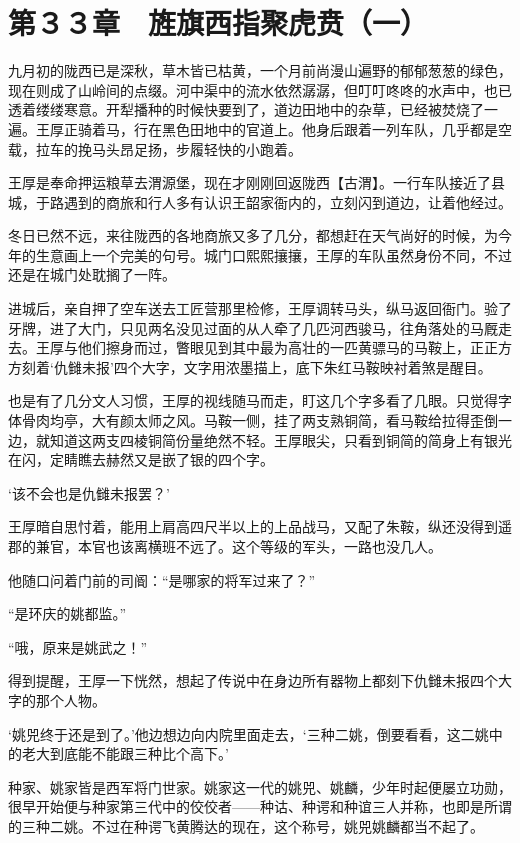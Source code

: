 \section{第３３章　旌旗西指聚虎贲（一）}

九月初的陇西已是深秋，草木皆已枯黄，一个月前尚漫山遍野的郁郁葱葱的绿色，现在则成了山岭间的点缀。河中渠中的流水依然潺潺，但叮叮咚咚的水声中，也已透着缕缕寒意。开犁播种的时候快要到了，道边田地中的杂草，已经被焚烧了一遍。王厚正骑着马，行在黑色田地中的官道上。他身后跟着一列车队，几乎都是空载，拉车的挽马头昂足扬，步履轻快的小跑着。

王厚是奉命押运粮草去渭源堡，现在才刚刚回返陇西【古渭】。一行车队接近了县城，于路遇到的商旅和行人多有认识王韶家衙内的，立刻闪到道边，让着他经过。

冬日已然不远，来往陇西的各地商旅又多了几分，都想赶在天气尚好的时候，为今年的生意画上一个完美的句号。城门口熙熙攘攘，王厚的车队虽然身份不同，不过还是在城门处耽搁了一阵。

进城后，亲自押了空车送去工匠营那里检修，王厚调转马头，纵马返回衙门。验了牙牌，进了大门，只见两名没见过面的从人牵了几匹河西骏马，往角落处的马厩走去。王厚与他们擦身而过，瞥眼见到其中最为高壮的一匹黄骠马的马鞍上，正正方方刻着‘仇雠未报’四个大字，文字用浓墨描上，底下朱红马鞍映衬着煞是醒目。

也是有了几分文人习惯，王厚的视线随马而走，盯这几个字多看了几眼。只觉得字体骨肉均亭，大有颜太师之风。马鞍一侧，挂了两支熟铜简，看马鞍给拉得歪倒一边，就知道这两支四棱铜简份量绝然不轻。王厚眼尖，只看到铜简的简身上有银光在闪，定睛瞧去赫然又是嵌了银的四个字。

‘该不会也是仇雠未报罢？’

王厚暗自思忖着，能用上肩高四尺半以上的上品战马，又配了朱鞍，纵还没得到遥郡的兼官，本官也该离横班不远了。这个等级的军头，一路也没几人。

他随口问着门前的司阍：“是哪家的将军过来了？”

“是环庆的姚都监。”

“哦，原来是姚武之！”

得到提醒，王厚一下恍然，想起了传说中在身边所有器物上都刻下仇雠未报四个大字的那个人物。

‘姚兕终于还是到了。’他边想边向内院里面走去，‘三种二姚，倒要看看，这二姚中的老大到底能不能跟三种比个高下。’

种家、姚家皆是西军将门世家。姚家这一代的姚兕、姚麟，少年时起便屡立功勋，很早开始便与种家第三代中的佼佼者——种诂、种谔和种谊三人并称，也即是所谓的三种二姚。不过在种谔飞黄腾达的现在，这个称号，姚兕姚麟都当不起了。

